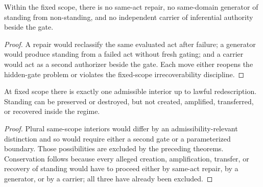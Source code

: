 \begin{corollary}
Within the fixed scope, there is no same-act repair, no same-domain generator of standing from non-standing, and no independent carrier of inferential authority beside the gate.
\end{corollary}

\begin{proof}
A repair would reclassify the same evaluated act after failure; a generator would produce standing from a failed act without fresh gating; and a carrier would act as a second authorizer beside the gate. Each move either reopens the hidden-gate problem or violates the fixed-scope irrecoverability discipline.
\end{proof}

\begin{theorem}
At fixed scope there is exactly one admissible interior up to lawful redescription. Standing can be preserved or destroyed, but not created, amplified, transferred, or recovered inside the regime.
\end{theorem}

\begin{proof}
Plural same-scope interiors would differ by an admissibility-relevant distinction and so would require either a second gate or a parameterized boundary. Those possibilities are excluded by the preceding theorems. Conservation follows because every alleged creation, amplification, transfer, or recovery of standing would have to proceed either by same-act repair, by a generator, or by a carrier; all three have already been excluded.
\end{proof}
